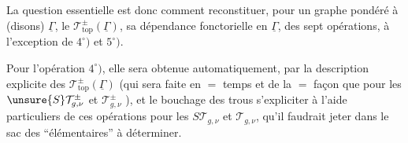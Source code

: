 
La question essentielle est donc comment reconstituer, pour un graphe \deleted{$\unsure{\Gamma}$} pondéré à
  (disons) $\underline\Gamma$, le
$\mathcal T_{\mathrm{top}}^\pm(\underline\Gamma)$,
  sa dépendance fonctorielle en $\underline\Gamma$,
 
des sept opérations, à l'exception de $4^\circ)$ et $5^\circ)$.

Pour l'opération $4^\circ)$, elle sera obtenue automatiquement, par la description explicite des
$\mathcal T_{\mathrm{top}}^\pm(\underline\Gamma)$
(qui sera faite en $=$ temps et de la $=$ façon que pour les $\unsure{S}\mathcal T_{g,\nu}^\pm$ et $\mathcal T_{g,\nu}^\pm$ ),
et le bouchage des trous  s'expliciter à l'aide   particuliers de ces opérations pour les
$S\mathcal T_{g,\nu}$ et $\mathcal T_{g,\nu}$, qu'il faudrait jeter dans le sac des
  ``élémentaires'' à déterminer.

\deleted{$(**)$}\quad
{}
